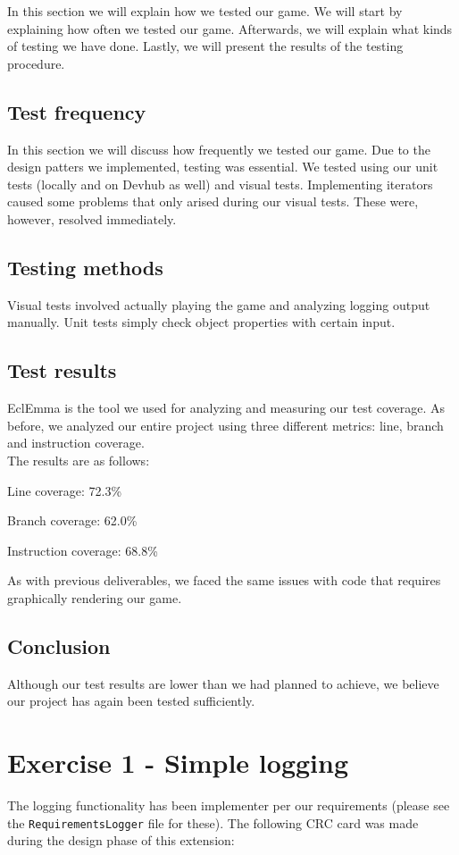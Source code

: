 \documentclass[a4paper,11pt,report]{scrartcl}
\begin{document}
In this section we will explain how we tested our game. We will start by
explaining how often we tested our game. Afterwards, we will explain what
kinds of testing we have done. Lastly, we will present the results of the
testing procedure.

\subsection{Test frequency}
In this section we will discuss how frequently we tested our game. Due to the
design patters we implemented, testing was essential. We tested using our
unit tests (locally and on Devhub as well) and visual tests. Implementing
iterators caused some problems that only arised during our visual tests. These
were, however, resolved immediately.

\subsection{Testing methods}
Visual tests involved actually playing the game and analyzing logging output
manually. Unit tests simply check object properties with certain input.

\subsection{Test results}
EclEmma is the tool we used for analyzing and measuring our test coverage.
As before, we analyzed our entire project using three different metrics: line,
branch and instruction coverage.\\

The results are as follows:
\begin{description}
	\item Line coverage: 72.3\%
	\item Branch coverage: 62.0\%
	\item Instruction coverage: 68.8\%
\end{description}
As with previous deliverables, we faced the same issues with code that requires
graphically rendering our game. 

\subsection{Conclusion}
Although our test results are lower than we had planned to achieve, we believe
our project has again been tested sufficiently.

\newpage\section{Exercise 1 - Simple logging}
The logging functionality has been implementer per our requirements (please see
the \texttt{RequirementsLogger} file for these). The following CRC card was made
during the design phase of this extension:\\
\end{document}
